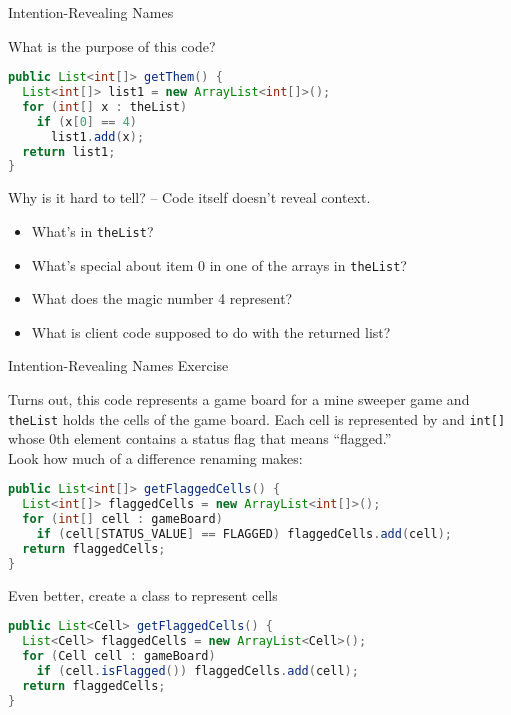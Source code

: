 \documentclass{beamer}
\begin{document}
\begin{frame}[fragile]{Intention-Revealing Names}


What is the purpose of this code?
\begin{lstlisting}[language=Java]
public List<int[]> getThem() {
  List<int[]> list1 = new ArrayList<int[]>();
  for (int[] x : theList)
    if (x[0] == 4)
      list1.add(x);
  return list1;
}
\end{lstlisting}
Why is it hard to tell? -- Code itself doesn't reveal context.

\begin{itemize}
\item What's in {\tt theList}?
\item What's special about item 0 in one of the arrays in {\tt theList}?
\item What does the magic number 4 represent?
\item What is client code supposed to do with the returned list?
\end{itemize}

\end{frame}

\begin{frame}[fragile]{Intention-Revealing Names Exercise}


Turns out, this code represents a game board for a mine sweeper game and {\tt theList} holds the cells of the game board.  Each cell is represented by and {\tt int[]} whose 0th element contains a status flag that means ``flagged.''\\
\vspace{.05in}
Look how much of a difference renaming makes:
\begin{lstlisting}[language=Java]
public List<int[]> getFlaggedCells() {
  List<int[]> flaggedCells = new ArrayList<int[]>();
  for (int[] cell : gameBoard)
    if (cell[STATUS_VALUE] == FLAGGED) flaggedCells.add(cell);
  return flaggedCells;
}
\end{lstlisting}
Even better, create a class to represent cells
\begin{lstlisting}[language=Java]
public List<Cell> getFlaggedCells() {
  List<Cell> flaggedCells = new ArrayList<Cell>();
  for (Cell cell : gameBoard)
    if (cell.isFlagged()) flaggedCells.add(cell);
  return flaggedCells;
}
\end{lstlisting}

\end{frame}
\end{document}
